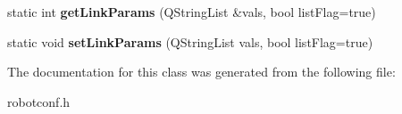 \begin{DoxyCompactItemize}
\item 
\hypertarget{classRobotConf_a86780000d22a431293ca8970bcd7d3aa}{static int {\bfseries get\-Link\-Params} (Q\-String\-List \&vals, bool list\-Flag=true)}\label{classRobotConf_a86780000d22a431293ca8970bcd7d3aa}

\item 
\hypertarget{classRobotConf_a240c13c620c4601ccf82e9a5acba3129}{static void {\bfseries set\-Link\-Params} (Q\-String\-List vals, bool list\-Flag=true)}\label{classRobotConf_a240c13c620c4601ccf82e9a5acba3129}

\end{DoxyCompactItemize}


The documentation for this class was generated from the following file\-:\begin{DoxyCompactItemize}
\item 
robotconf.\-h\end{DoxyCompactItemize}
